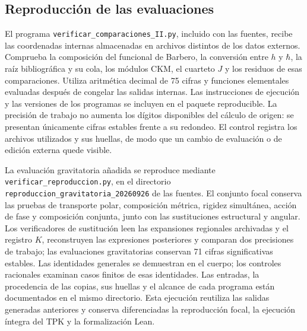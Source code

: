 \subsection{Reproducción de las evaluaciones}

El programa \texttt{verificar\_comparaciones\_II.py}, incluido con las
fuentes, recibe las coordenadas internas almacenadas en archivos distintos
de los datos externos. Comprueba la composición del funcional de Barbero,
la conversión entre \(h\) y \(\hbar\), la raíz bibliográfica y su cola,
los módulos CKM, el cuarteto \(J\) y los residuos de esas comparaciones. Utiliza
aritmética decimal de 75 cifras y funciones elementales evaluadas después
de congelar las salidas internas. Las instrucciones de ejecución
y las versiones de los programas se incluyen en el paquete reproducible.
La precisión de trabajo no aumenta los dígitos disponibles del
cálculo de origen: se presentan únicamente cifras estables frente a su redondeo.
El control registra los archivos utilizados y sus huellas, de modo que
un cambio de evaluación o de edición externa quede visible.

La evaluación gravitatoria añadida se reproduce mediante
\texttt{verificar\_reproduccion.py}, en el directorio
\texttt{reproduccion\_gravitatoria\_20260926} de las fuentes.
El conjunto focal conserva las pruebas de transporte polar, composición
métrica, rigidez simultánea, acción de fase y composición conjunta,
junto con las sustituciones estructural y angular. Los verificadores
de sustitución leen las expansiones regionales archivadas y el registro
\(K\), reconstruyen las expresiones posteriores y comparan dos precisiones
de trabajo; las evaluaciones gravitatorias conservan 71 cifras
significativas estables. Las identidades generales se demuestran en el
cuerpo; los controles racionales examinan casos finitos de esas identidades.
Las entradas, la procedencia de las copias, sus huellas y el alcance de
cada programa están documentados en el mismo directorio. Esta ejecución
reutiliza las salidas generadas anteriores y conserva diferenciadas la
reproducción focal, la ejecución íntegra del TPK y la formalización Lean.

